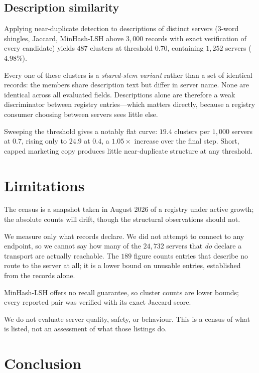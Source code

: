 \documentclass[11pt]{article}
\begin{document}
\subsection{Description similarity}

Applying near-duplicate detection to descriptions of distinct servers
($3$-word shingles, Jaccard, MinHash-LSH above $3{,}000$ records with exact
verification of every candidate) yields $487$ clusters at threshold $0.70$,
containing $1{,}252$ servers ($4.98\%$).

Every one of these clusters is a \emph{shared-stem variant} rather than a set
of identical records: the members share description text but differ in server
name. None are identical across all evaluated fields. Descriptions alone are
therefore a weak discriminator between registry entries---which matters
directly, because a registry consumer choosing between servers sees little
else.

Sweeping the threshold gives a notably flat curve: $19.4$ clusters per $1{,}000$
servers at $0.7$, rising only to $24.9$ at $0.4$, a $1.05\times$ increase over
the final step. Short, capped marketing copy produces little near-duplicate
structure at any threshold.

\section{Limitations}

The census is a snapshot taken in August 2026 of a registry under active
growth; the absolute counts will drift, though the structural observations
should not.

We measure only what records declare. We did not attempt to connect to any
endpoint, so we cannot say how many of the $24{,}732$ servers that \emph{do}
declare a transport are actually reachable. The $189$ figure counts entries
that describe no route to the server at all; it is a lower bound on unusable
entries, established from the records alone.

MinHash-LSH offers no recall guarantee, so cluster counts are lower bounds;
every reported pair was verified with its exact Jaccard score.

We do not evaluate server quality, safety, or behaviour. This is a census of
what is listed, not an assessment of what those listings do.

\section{Conclusion}
\end{document}
